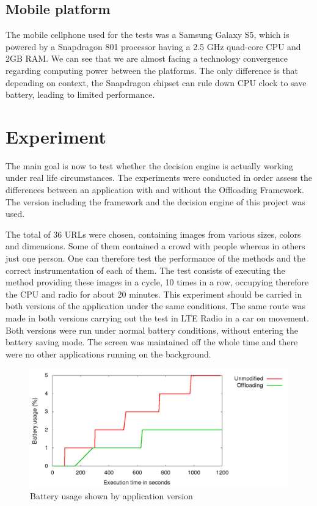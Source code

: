 \documentclass[10pt, conference, letterpaper]{IEEEtran}
\begin{document}
  \subsection{Mobile platform}
  The mobile cellphone used for the tests was a Samsung Galaxy S5, which is powered by a Snapdragon 801 processor having a 2.5 GHz quad-core CPU and 2GB RAM. We can see that we are almost facing a technology convergence regarding computing power between the platforms. The only difference is that depending on context, the Snapdragon chipset can rule down CPU clock to save battery, leading to limited performance.

  \section{Experiment}
  The main goal is now to test whether the decision engine is actually working under real life circumstances. The experiments were conducted in order assess the differences between an application with and without the Offloading Framework. The version including the framework and the decision engine of this project was used.

  The total of 36 URLs were chosen, containing images from various sizes, colors and dimensions. Some of them contained a crowd with people whereas in others just one person. One can therefore test the performance of the methods and the correct instrumentation of each of them. The test consists of executing the method providing these images in a cycle, 10 times in a row, occupying therefore the CPU and radio for about 20 minutes. This experiment should be carried in both versions of the application under the same conditions. The same route was made in both versions carrying out the test in LTE Radio in a car on movement. Both versions were run under normal battery conditions, without entering the battery saving mode. The screen was maintained off the whole time and there were no other applications running on the background.

\begin{figure}[!t]
  \centering
  \includegraphics[width=1\textwidth]{results/plots/executions.png}
  \caption{Battery usage shown by application version}
  \label{fig:batteryusage}
\end{figure}
\end{document}
